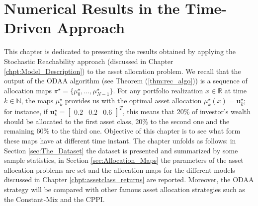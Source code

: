 \chapter{Numerical Results in the Time-Driven Approach}\label{chpt:NumResTD}
This chapter is dedicated to presenting the results obtained by applying the Stochastic Reachability approach (discussed in Chapter \ref{chpt:Model_Description}) to the asset allocation problem. We recall that the output of the ODAA algorithm (see Theorem (\ref{thm:rec_algo})) is a sequence of allocation maps $\pi^{\star}=\{\mu_0^{\star},\ldots,\mu_{N-1}^{\star}\}$. For any portfolio realization $x \in \mathbb{R}$ at time $k \in \mathbb{N}$, the maps $\mu_k^{\star}$ provides us with the optimal asset allocation $\mu_k^{\star}(x)=\bm{u}_k^{\star}$; for instance, if $\bm{u}_k^{\star}= \begin{bmatrix}
0.2 & 0.2 & 0.6
\end{bmatrix}^T$, this means that 20\% of investor's wealth should be allocated to the first asset class, 20\% to the second one and the remaining 60\% to the third one. Objective of this chapter is to see what form these maps have at different time instant. The chapter unfolds as follows: in Section \ref{sec:The_Dataset} the dataset is presented and summarized by some sample statistics, in Section \ref{sec:Allocation_Maps} the parameters of the asset allocation problems are set and the allocation maps for the different models discussed in Chapter \ref{chpt:assetclass_returns} are reported. Moreover, the ODAA strategy will be compared with other famous asset allocation strategies such as the Constant-Mix and the \gls{CPPI}.


